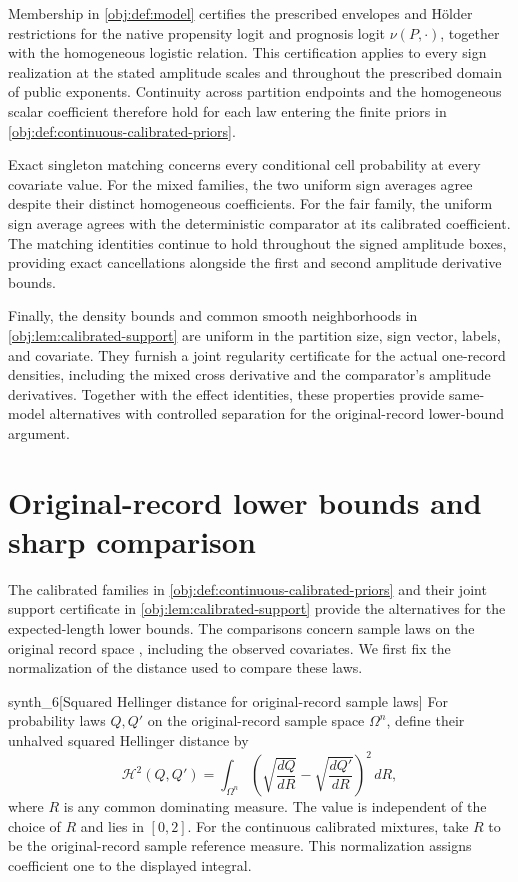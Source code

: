 \documentclass[11pt]{article}
\begin{document}
Membership in \cref{obj:def:model} certifies the prescribed envelopes and Hölder restrictions for the native propensity logit  and prognosis logit \(\nu(P,\cdot)\), together with the homogeneous logistic relation. This certification applies to every sign realization at the stated amplitude scales and throughout the prescribed domain of public exponents. Continuity across partition endpoints and the homogeneous scalar coefficient therefore hold for each law entering the finite priors in \cref{obj:def:continuous-calibrated-priors}.

Exact singleton matching concerns every conditional cell probability at every covariate value. For the mixed families, the two uniform sign averages agree despite their distinct homogeneous coefficients. For the fair family, the uniform sign average agrees with the deterministic comparator at its calibrated coefficient. The matching identities continue to hold throughout the signed amplitude boxes, providing exact cancellations alongside the first and second amplitude derivative bounds.

Finally, the density bounds and common smooth neighborhoods in \cref{obj:lem:calibrated-support} are uniform in the partition size, sign vector, labels, and covariate. They furnish a joint regularity certificate for the actual one-record densities, including the mixed cross derivative and the comparator's amplitude derivatives. Together with the effect identities, these properties provide same-model alternatives with controlled separation for the original-record lower-bound argument.


\section{Original-record lower bounds and sharp comparison}

The calibrated families in \cref{obj:def:continuous-calibrated-priors} and their joint support certificate in \cref{obj:lem:calibrated-support} provide the alternatives for the expected-length lower bounds. The comparisons concern sample laws on the original record space , including the observed covariates. We first fix the normalization of the distance used to compare these laws.

\begin{definitionv}{synth_6}[Squared Hellinger distance for original-record sample laws]
For probability laws \(Q,Q'\) on the original-record sample space \(\Omega^n\), define their unhalved squared Hellinger distance by
\[
\mathcal H^2(Q,Q')
=
\int_{\Omega^n}
\left(
\sqrt{\frac{dQ}{dR}}
-
\sqrt{\frac{dQ'}{dR}}
\right)^2\,dR,
\]
where \(R\) is any common dominating measure. The value is independent of the choice of \(R\) and lies in \([0,2]\). For the continuous calibrated mixtures, take \(R\) to be the original-record sample reference measure. This normalization assigns coefficient one to the displayed integral.
\end{definitionv}
\end{document}
